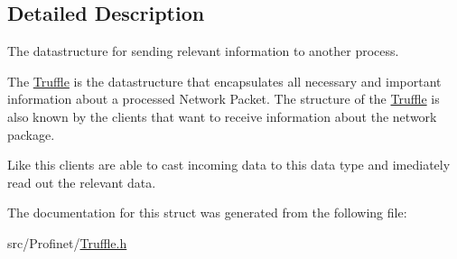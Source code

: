 \subsection{Detailed Description}
The datastructure for sending relevant information to another process. 

The \hyperlink{struct_truffle}{Truffle} is the datastructure that encapsulates all necessary and important information about a processed Network Packet. The structure of the \hyperlink{struct_truffle}{Truffle} is also known by the clients that want to receive information about the network package.

Like this clients are able to cast incoming data to this data type and imediately read out the relevant data. 

The documentation for this struct was generated from the following file\-:\begin{DoxyCompactItemize}
\item 
src/\-Profinet/\hyperlink{_truffle_8h}{Truffle.\-h}\end{DoxyCompactItemize}
